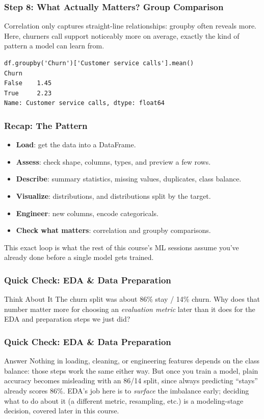 \begin{frame}[fragile]\frametitle{Step 8: What Actually Matters? Group Comparison}
Correlation only captures straight-line relationships: groupby often reveals more. Here,
churners call support noticeably more on average, exactly the kind of pattern a model can
learn from.
\begin{lstlisting}
df.groupby('Churn')['Customer service calls'].mean()
Churn
False    1.45
True     2.23
Name: Customer service calls, dtype: float64
\end{lstlisting}
\end{frame}

\begin{frame}[fragile]\frametitle{Recap: The Pattern}
\begin{itemize}
\item \textbf{Load}: get the data into a DataFrame.
\item \textbf{Assess}: check shape, columns, types, and preview a few rows.
\item \textbf{Describe}: summary statistics, missing values, duplicates, class balance.
\item \textbf{Visualize}: distributions, and distributions split by the target.
\item \textbf{Engineer}: new columns, encode categoricals.
\item \textbf{Check what matters}: correlation and groupby comparisons.
\end{itemize}
This exact loop is what the rest of this course's ML sessions assume you've already done
before a single model gets trained.
\end{frame}

\begin{frame}[fragile]\frametitle{Quick Check: EDA \& Data Preparation}
\begin{block}{Think About It}
The churn split was about 86\% stay / 14\% churn. Why does that number matter more for
choosing an \emph{evaluation metric} later than it does for the EDA and preparation steps
we just did?
\end{block}
\end{frame}

\begin{frame}[fragile]\frametitle{Quick Check: EDA \& Data Preparation}
\begin{block}{Answer}
Nothing in loading, cleaning, or engineering features depends on the class balance: those
steps work the same either way. But once you train a model, plain accuracy becomes
misleading with an 86/14 split, since always predicting ``stays'' already scores 86\%. EDA's
job here is to \emph{surface} the imbalance early; deciding what to do about it (a different
metric, resampling, etc.) is a modeling-stage decision, covered later in this course.
\end{block}
\end{frame}
